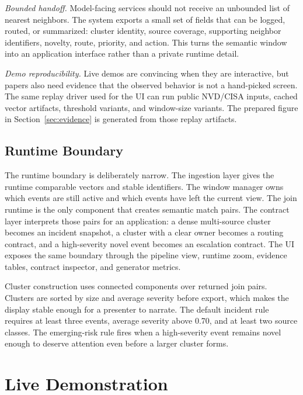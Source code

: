 \documentclass[sigconf,anonymous]{acmart}
\begin{document}
\emph{Bounded handoff.} Model-facing services should not receive an unbounded list of nearest neighbors. The system exports a small set of fields that can be logged, routed, or summarized: cluster identity, source coverage, supporting neighbor identifiers, novelty, route, priority, and action. This turns the semantic window into an application interface rather than a private runtime detail.

\emph{Demo reproducibility.} Live demos are convincing when they are interactive, but papers also need evidence that the observed behavior is not a hand-picked screen. The same replay driver used for the UI can run public NVD/CISA inputs, cached vector artifacts, threshold variants, and window-size variants. The prepared figure in Section~\ref{sec:evidence} is generated from those replay artifacts.

\subsection{Runtime Boundary}

The runtime boundary is deliberately narrow. The ingestion layer gives the runtime comparable vectors and stable identifiers. The window manager owns which events are still active and which events have left the current view. The join runtime is the only component that creates semantic match pairs. The contract layer interprets those pairs for an application: a dense multi-source cluster becomes an incident snapshot, a cluster with a clear owner becomes a routing contract, and a high-severity novel event becomes an escalation contract. The UI exposes the same boundary through the pipeline view, runtime zoom, evidence tables, contract inspector, and generator metrics.

Cluster construction uses connected components over returned join pairs. Clusters are sorted by size and average severity before export, which makes the display stable enough for a presenter to narrate. The default incident rule requires at least three events, average severity above 0.70, and at least two source classes. The emerging-risk rule fires when a high-severity event remains novel enough to deserve attention even before a larger cluster forms.

\section{Live Demonstration}
\end{document}
